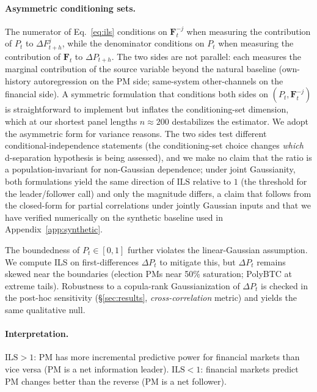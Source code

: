\documentclass{article}
\begin{document}
\paragraph{Asymmetric conditioning sets.}
The numerator of Eq.~\eqref{eq:ils} conditions on $\mathbf{F}^{-j}_t$ when measuring the contribution of $P_t$ to $\Delta F^j_{t+h}$, while the denominator conditions on $P_t$ when measuring the contribution of $\mathbf{F}_t$ to $\Delta P_{t+h}$. The two sides are not parallel: each measures the marginal contribution of the source variable beyond the natural baseline (own-history autoregression on the PM side; same-system other-channels on the financial side). A symmetric formulation that conditions both sides on $(P_t, \mathbf{F}^{-j}_t)$ is straightforward to implement but inflates the conditioning-set dimension, which at our shortest panel lengths $n \approx 200$ destabilizes the estimator. We adopt the asymmetric form for variance reasons. The two sides test different conditional-independence statements (the conditioning-set choice changes \emph{which} d-separation hypothesis is being assessed), and we make no claim that the ratio is a population-invariant for non-Gaussian dependence; under joint Gaussianity, both formulations yield the same direction of $\mathrm{ILS}$ relative to $1$ (the threshold for the leader/follower call) and only the magnitude differs, a claim that follows from the closed-form for partial correlations under jointly Gaussian inputs and that we have verified numerically on the synthetic baseline used in Appendix~\ref{app:synthetic}.

The boundedness of $P_t \in [0,1]$ further violates the linear-Gaussian assumption. We compute ILS on first-differences $\Delta P_t$ to mitigate this, but $\Delta P_t$ remains skewed near the boundaries (election PMs near 50\% saturation; PolyBTC at extreme tails). Robustness to a copula-rank Gaussianization of $\Delta P_t$ is checked in the post-hoc sensitivity (\S\ref{sec:results}, \emph{cross-correlation} metric) and yields the same qualitative null.

\paragraph{Interpretation.}
$\mathrm{ILS} > 1$: PM has more incremental predictive power for financial markets than vice versa (PM is a net information leader). $\mathrm{ILS} < 1$: financial markets predict PM changes better than the reverse (PM is a net follower).
\end{document}
